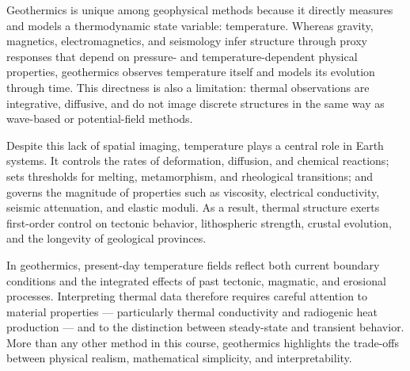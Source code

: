 Geothermics is unique among geophysical methods because it directly measures and models a thermodynamic state variable: temperature.
Whereas gravity, magnetics, electromagnetics, and seismology infer structure through proxy responses that depend on pressure- and temperature-dependent physical properties, geothermics observes temperature itself and models its evolution through time. This directness is also a limitation: thermal observations are integrative, diffusive, and do not image discrete structures in the same way as wave-based or potential-field methods.

Despite this lack of spatial imaging, temperature plays a central role in Earth systems. It controls the rates of deformation, diffusion, and chemical reactions; sets thresholds for melting, metamorphism, and rheological transitions; and governs the magnitude of properties such as viscosity, electrical conductivity, seismic attenuation, and elastic moduli. As a result, thermal structure exerts first-order control on tectonic behavior, lithospheric strength, crustal evolution, and the longevity of geological provinces.

In geothermics, present-day temperature fields reflect both current boundary conditions and the integrated effects of past tectonic, magmatic, and erosional processes. Interpreting thermal data therefore requires careful attention to material properties — particularly thermal conductivity and radiogenic heat production — and to the distinction between steady-state and transient behavior. More than any other method in this course, geothermics highlights the trade-offs between physical realism, mathematical simplicity, and interpretability.
